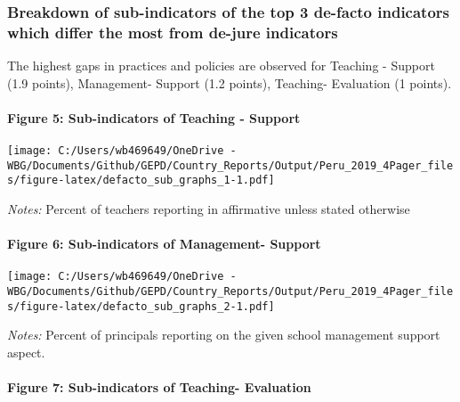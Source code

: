 \documentclass[twocolumn]{article}
\let\oldparagraph\paragraph
\renewcommand{\paragraph}[1]{\oldparagraph{#1}\mbox{}}
\begin{document}
\hypertarget{breakdown-of-sub-indicators-of-the-top-3-de-facto-indicators-which-differ-the-most-from-de-jure-indicators}{%
\subsubsection{\texorpdfstring{\textbf{Breakdown of sub-indicators of
the top 3 de-facto indicators which differ the most from de-jure
indicators}}{Breakdown of sub-indicators of the top 3 de-facto indicators which differ the most from de-jure indicators}}\label{breakdown-of-sub-indicators-of-the-top-3-de-facto-indicators-which-differ-the-most-from-de-jure-indicators}}

The highest gaps in practices and policies are observed for Teaching -
Support (1.9 points), Management- Support (1.2 points), Teaching-
Evaluation (1 points). \vfill\null

\hypertarget{figure-5-sub-indicators-of-teaching---support}{%
\paragraph{Figure 5: Sub-indicators of Teaching -
Support}\label{figure-5-sub-indicators-of-teaching---support}}

\texttt{[image: C:/Users/wb469649/OneDrive - WBG/Documents/Github/GEPD/Country\_Reports/Output/Peru\_2019\_4Pager\_files/figure-latex/defacto\_sub\_graphs\_1-1.pdf]}

\color{darkgray}\scriptsize{\textit{Notes:} Percent of teachers reporting in affirmative unless stated otherwise}

\hypertarget{figure-6-sub-indicators-of-management--support}{%
\paragraph{Figure 6: Sub-indicators of Management-
Support}\label{figure-6-sub-indicators-of-management--support}}

\texttt{[image: C:/Users/wb469649/OneDrive - WBG/Documents/Github/GEPD/Country\_Reports/Output/Peru\_2019\_4Pager\_files/figure-latex/defacto\_sub\_graphs\_2-1.pdf]}

\color{darkgray}\scriptsize{\textit{Notes:} Percent of principals reporting on the given school management support aspect.}

\hypertarget{figure-7-sub-indicators-of-teaching--evaluation}{%
\paragraph{Figure 7: Sub-indicators of Teaching-
Evaluation}\label{figure-7-sub-indicators-of-teaching--evaluation}}
\end{document}
